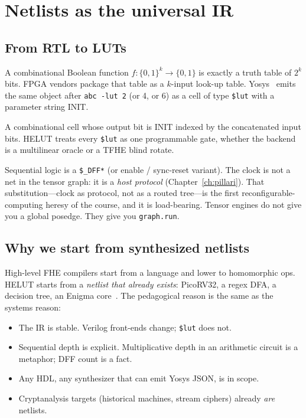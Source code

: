 \chapter{Netlists as the universal IR}
\label{ch:reconf}

\section{From RTL to LUTs}

A combinational Boolean function $f:\{0,1\}^k\to\{0,1\}$ is exactly a truth
table of $2^k$ bits.
FPGA vendors package that table as a $k$-input look-up table.
Yosys~\cite{yosys} emits the same object after \texttt{abc -lut 2} (or 4, or 6)
as a cell of type \texttt{\$lut} with a parameter string INIT.

\begin{definition}
A combinational cell whose output bit is INIT indexed by the concatenated
input bits. HELUT treats every \texttt{\$lut} as one programmable gate, whether
the backend is a multilinear oracle or a TFHE blind rotate.
\end{definition}

Sequential logic is a \texttt{\$\_DFF*} (or enable / sync-reset variant).
The clock is not a net in the tensor graph: it is a \emph{host protocol}
(Chapter~\ref{ch:pillari}).
That substitution---clock as protocol, not as a routed tree---is the first
reconfigurable-computing heresy of the course, and it is load-bearing.
Tensor engines do not give you a global posedge. They give you
\texttt{graph.run}.

\section{Why we start from synthesized netlists}

High-level FHE compilers start from a language and lower to homomorphic ops.
HELUT starts from a \emph{netlist that already exists}: PicoRV32, a regex DFA,
a decision tree, an Enigma core~\cite{picorv32}.
The pedagogical reason is the same as the systems reason:

\begin{itemize}
  \item The IR is stable. Verilog front-ends change; \texttt{\$lut} does not.
  \item Sequential depth is explicit. Multiplicative depth in an arithmetic
        circuit is a metaphor; DFF count is a fact.
  \item Any HDL, any synthesizer that can emit Yosys JSON, is in scope.
  \item Cryptanalysis targets (historical machines, stream ciphers) already
        \emph{are} netlists.
\end{itemize}

